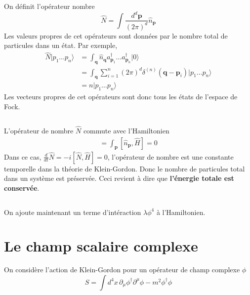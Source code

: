 \documentclass{article}
\numberwithin{equation}{section}
\begin{document}

\subsection{}
On définit l'opérateur nombre 
\begin{equation}
        \hat{N} = \int \frac{d^{d}\mathbf{p}}{(2\pi)^{d}} \hat{n}_{\mathbf{p}}
\end{equation} 
Les valeurs propres de cet opérateurs sont données par le nombre total de particules dans un état. Par exemple,
\begin{align*}
        \hat{N} | p_1 \dots p_n \rangle &= \int_{\mathbf{q}} \hat{n}_{\mathbf{q}} a^{\dagger}_{\mathbf{p}_1} \dots a^{\dagger}_{\mathbf{p}_n} | 0 \rangle  \\
        &= \int_{\mathbf{q}} \sum_{i=1}^{n} (2\pi)^{d}\delta^{(n)}(\mathbf{q} - \mathbf{p}_i) | p_1 \dots p_n \rangle  \\
        &= n | p_1 \dots p_n \rangle 
\end{align*}
Les vecteurs propres de cet opérateurs sont donc tous les états de l'espace de Fock. 


\subsection{}
L'opérateur de nombre $\hat{N}$ commute avec l'Hamiltonien 
\begin{align*}
        [\hat{N}, \hat{H}] = \int_{\mathbf{p}}  [\hat{n}_{\mathbf{p}}, \hat{H}] = 0
\end{align*}
Dans ce cas, $\frac{d}{dt}\hat{N} = -i[\hat{N}, \hat{H}] = 0$, l'opérateur de nombre est une constante temporelle dans la théorie de Klein-Gordon. Donc le nombre de 
particules total dans un système est préservée.
Ceci revient à dire que \textbf{l'énergie totale est conservée}.

\subsection{}
On ajoute maintenant un terme d'intéraction $\lambda \phi^{4}$ à l'Hamiltonien. 

\section{Le champ scalaire complexe}
On considère l'action de Klein-Gordon pour un opérateur de champ complexe $\phi$
\begin{equation}
        S = \int d^{4}x\, \partial_{\mu} \phi^{\dagger} \partial^{\mu}\phi - m^{2} \phi^{\dagger}\phi
\end{equation} 
\end{document}

